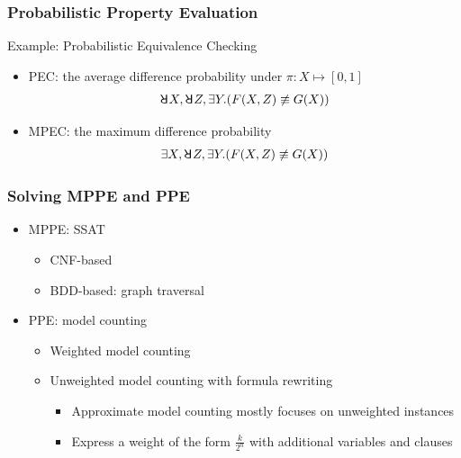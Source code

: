 \begin{frame}
    \frametitle{Probabilistic Property Evaluation}
    \begin{block}{Example: Probabilistic Equivalence Checking}
        \begin{figure}
            \centering
            
        \end{figure}
        \begin{itemize}
            \item PEC: the average difference probability under $\pi:X\mapsto[0,1]$
                  \abovedisplayskip=0pt
                  \belowdisplayskip=0pt
                  \begin{align*}
                      \random{} X,\random{} Z,\exists Y.(F(X,Z) \not\equiv G(X))
                  \end{align*}
                  \abovedisplayskip=0pt
                  \belowdisplayskip=0pt
            \item MPEC: the maximum difference probability
                  \begin{align*}
                      \exists X,\random{} Z,\exists Y.(F(X,Z) \not\equiv G(X))
                  \end{align*}
        \end{itemize}
    \end{block}
\end{frame}

\begin{frame}
    \frametitle{Solving MPPE and PPE}
    \begin{itemize}
        \item MPPE: SSAT
              \begin{itemize}
                  \item CNF-based
                  \item BDD-based: graph traversal
              \end{itemize}
              \pause
        \item PPE: model counting
              \begin{itemize}
                  \item Weighted model counting
                  \item Unweighted model counting with formula rewriting
                        \begin{itemize}
                            \item Approximate model counting mostly focuses on unweighted instances
                            \item Express a weight of the form $\frac{k}{2^n}$ with additional variables and clauses
                        \end{itemize}
              \end{itemize}
    \end{itemize}
\end{frame}